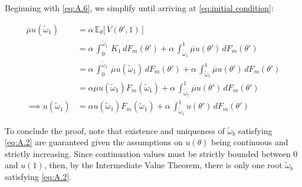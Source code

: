 Beginning with \ref{eq:A.6}, we simplify until arriving at \autoref{eq:initial condition}:

\begin{equation*} 
    \begin{split}
        \overline\mu u(\widetilde\omega_1) &= \alpha \, \mathbb{E}_\theta\Big[\,V(\theta',1)\,\Big]\\
        &= \alpha \,\int^{\widetilde\omega_1}_0\,K_1\,dF_m(\theta') + \alpha \,\int_{\widetilde\omega_1}^1 \overline\mu u(\theta')\,dF_m(\theta')\\
        &= \alpha \,\int^{\widetilde\omega_1}_0\,\overline\mu u(\widetilde\omega_1)\,dF_m(\theta') + \alpha \,\int_{\widetilde\omega_1}^1 \overline\mu u(\theta')\,dF_m(\theta')\\
        &= \alpha \overline\mu u(\widetilde\omega_1)F_m(\widetilde\omega_1) + \alpha \,\int_{\widetilde\omega_1}^1 \overline\mu u(\theta')\,dF_m(\theta')\\
        \implies u(\widetilde\omega_1) &= \alpha u(\widetilde\omega_1)F_m(\widetilde\omega_1) + \alpha \,\int_{\widetilde\omega_1}^1 u(\theta')\,dF_m(\theta') 
    \end{split}
\end{equation*}  

To conclude the proof, note that existence and uniqueness of $\widetilde\omega_b$ satisfying \ref{eq:A.2} are guaranteed given the assumptions on $u(\theta)$ being continuous and strictly increasing. Since continuation values must be strictly bounded between 0 and $u(1)$, then, by the Intermediate Value Theorem, there is only one root $\widetilde\omega_b$ satisfying \ref{eq:A.2}.
